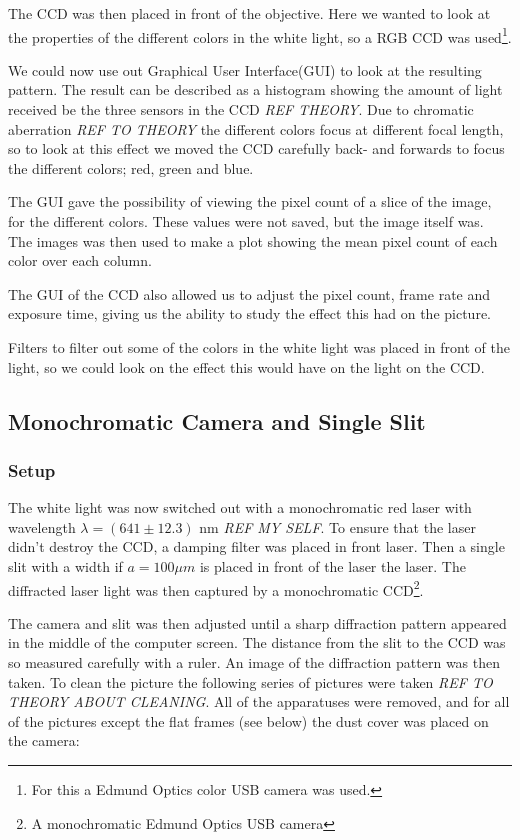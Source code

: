 \documentclass{emulateapj}
\begin{document}
The CCD was then placed in front of the objective. Here we wanted to look at the properties of the different colors in the white light, so a RGB CCD was used\footnote{For this a Edmund Optics color USB camera was used.}. 

We could now use out Graphical User Interface(GUI) to look at the resulting pattern. The result can be described as a histogram showing the amount of light received be the three sensors in the CCD \emph{REF THEORY}. Due to chromatic aberration \emph{REF TO THEORY} the different colors focus at different focal length, so to look at this effect we moved the CCD carefully back- and forwards to focus the different colors; red, green and blue.

The GUI gave the possibility of viewing the pixel count of a slice of the image, for the different colors. These values were not saved, but the image itself was. The images was then used to make a plot showing the mean pixel count of each color over each column.

The GUI of the CCD also allowed us to adjust the pixel count, frame rate and exposure time, giving us the ability to study the effect this had on the picture.

Filters to filter out some of the colors in the white light was placed in front of the light, so we could look on the effect this would have on the light on the CCD. 


\subsection{Monochromatic Camera and Single Slit}

\subsubsection{Setup}

The white light was now switched out with a monochromatic red laser with wavelength $\lambda = (641 \pm 12.3)$ nm \emph{REF MY SELF}. To ensure that the laser didn't destroy the CCD, a damping filter was placed in front laser. Then a single slit with a width if $a = 100\mu m$ is placed in front of the laser the laser. The diffracted laser light was then captured by a monochromatic CCD\footnote{A monochromatic Edmund Optics USB camera}. 

The camera and slit was then adjusted until a sharp diffraction pattern appeared in the middle of the computer screen. The distance from the slit to the CCD was so measured carefully with a ruler. An image of the diffraction pattern was then taken. To clean the picture the following series of pictures were taken \emph{REF TO THEORY ABOUT CLEANING}. All of the apparatuses were removed, and for all of the pictures except the flat frames (see below) the dust cover was placed on the camera: \\
\end{document}
